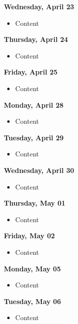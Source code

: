 \documentclass{article}
\begin{document}
\textbf{Wednesday, April 23}

\begin{itemize}
\item Content
\end{itemize}

\textbf{Thursday, April 24}

\begin{itemize}
\item Content
\end{itemize}

\textbf{Friday, April 25}

\begin{itemize}
\item Content
\end{itemize}

\textbf{Monday, April 28}

\begin{itemize}
\item Content
\end{itemize}

\textbf{Tuesday, April 29}

\begin{itemize}
\item Content
\end{itemize}

\textbf{Wednesday, April 30}

\begin{itemize}
\item Content
\end{itemize}

\textbf{Thursday, May 01}

\begin{itemize}
\item Content
\end{itemize}

\textbf{Friday, May 02}

\begin{itemize}
\item Content
\end{itemize}

\textbf{Monday, May 05}

\begin{itemize}
\item Content
\end{itemize}

\textbf{Tuesday, May 06}

\begin{itemize}
\item Content
\end{itemize}
\end{document}
